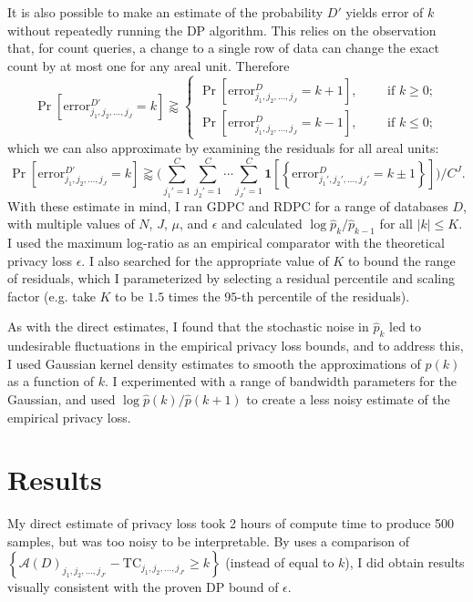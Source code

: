 \documentclass{article}
\begin{document}
It is also possible to make an estimate of the probability $D'$ yields error of $k$ without repeatedly running the DP algorithm.  This relies on the observation that, for count queries, a change to a single row of data can change the exact count by at most one for any areal unit.  Therefore
$$
\Pr\left[\mathrm{error}_{j_1, j_2, \ldots, j_{J}}^{D'}
= k\right]
\gtrapprox
\begin{cases}
\Pr\left[\mathrm{error}_{j_1, j_2, \ldots, j_{J}}^{D}
= k+1\right], \qquad \text{ if } k \geq 0;\\[.1in]
\Pr\left[\mathrm{error}_{j_1, j_2, \ldots, j_{J}}^{D}
= k-1\right], \qquad \text{ if } k \leq 0;
\end{cases}
$$
which we can also approximate by examining the residuals for all areal units:
$$\Pr\left[\mathrm{error}_{j_1, j_2, \ldots, j_{J}}^{D'}
= k\right]
\gtrapprox 
\bigg(\sum_{j_1'=1}^C\sum_{j_2'=1}^C\cdots\sum_{j_J' = 1}^C \mathbf{1}\left[\left\{\mathrm{error}_{j_1', j_2', \ldots, j_{J}'}^D
= k\pm 1\right\}\right]\bigg)\bigg/C^J.
$$
With these estimate in mind, I ran GDPC and RDPC for a range of databases $D$, with multiple values of $N$, $J$, $\mu$, and $\epsilon$ and calculated $\log \hat{p}_k / \hat{p}_{k-1}$ for all $|k| \leq K$. I used the maximum log-ratio as an empirical comparator with the theoretical privacy loss $\epsilon$.  I also searched for the appropriate value of $K$ to bound the range of residuals, which I parameterized by selecting a residual percentile and scaling factor (e.g. take $K$ to be $1.5$ times the $95$-th percentile of the residuals).

As with the direct estimates, I found that the stochastic noise in $\hat{p}_k$ led to undesirable fluctuations in the empirical privacy loss bounds, and to address this, I used Gaussian kernel density estimates to smooth the approximations of $\hat{p}(k)$ as a function of $k$.  I experimented with a range of bandwidth parameters for the Gaussian, and used $\log \hat{p}(k) / \hat{p}(k+1)$ to create a less noisy estimate of the empirical privacy loss.

\section{Results}
\label{results}

My direct estimate of privacy loss took 2 hours of compute time to produce 500 samples, but was too noisy to be interpretable.
By uses a comparison of $\left\{\mathcal{A}(D)_{j_1, j_2, \ldots, j_{J'}}
- \mathrm{TC}_{j_1, j_2, \ldots, j_{J'}}
\geq k\right\}$ (instead of equal to $k$), I did obtain results visually consistent with the proven DP bound of $\epsilon$.
\end{document}
